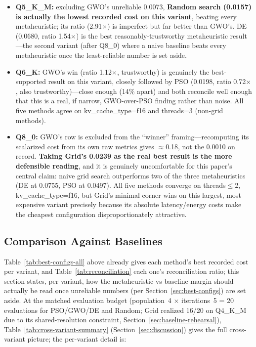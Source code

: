 \documentclass[journal]{IEEEtran}
\begin{document}
\begin{itemize}
  \item \textbf{Q5\_K\_M:} excluding GWO's unreliable 0.0073, \textbf{Random search (0.0157) is actually the lowest recorded cost on this variant}, beating every metaheuristic; its ratio (2.91$\times$) is imperfect but far better than GWO's. DE (0.0680, ratio 1.54$\times$) is the best reasonably-trustworthy metaheuristic result---the second variant (after Q8\_0) where a naive baseline beats every metaheuristic once the least-reliable number is set aside.
  \item \textbf{Q6\_K:} GWO's win (ratio 1.12$\times$, trustworthy) is genuinely the best-supported result on this variant, closely followed by PSO (0.0198, ratio 0.72$\times$, also trustworthy)---close enough (14\% apart) and both reconcile well enough that this is a real, if narrow, GWO-over-PSO finding rather than noise. All five methods agree on kv\_cache\_type=f16 and threads=3 (non-grid methods).
  \item \textbf{Q8\_0:} GWO's row is excluded from the ``winner'' framing---recomputing its scalarized cost from its own raw metrics gives $\approx$0.18, not the 0.0010 on record. \textbf{Taking Grid's 0.0239 as the real best result is the more defensible reading}, and it is genuinely uncomfortable for this paper's central claim: naive grid search outperforms two of the three metaheuristics (DE at 0.0755, PSO at 0.0497). All five methods converge on threads$\leq$2, kv\_cache\_type=f16, but Grid's minimal corner wins on this largest, most expensive variant precisely because its absolute latency/energy costs make the cheapest configuration disproportionately attractive.
\end{itemize}

\subsection{Comparison Against Baselines}
\label{sec:baseline-comparison-real}

Table~\ref{tab:best-configs-all} above already gives each method's best recorded cost per variant, and Table~\ref{tab:reconciliation} each one's reconciliation ratio; this section states, per variant, how the metaheuristic-vs-baseline margin should actually be read once unreliable numbers (per Section~\ref{sec:best-configs}) are set aside. At the matched evaluation budget (population~4 $\times$ iterations~5 = 20 evaluations for PSO/GWO/DE and Random; Grid realized 16/20 on Q4\_K\_M due to its shared-resolution constraint, Section~\ref{sec:baseline-rehearsal}), Table~\ref{tab:cross-variant-summary} (Section~\ref{sec:discussion}) gives the full cross-variant picture; the per-variant detail is:
\end{document}
